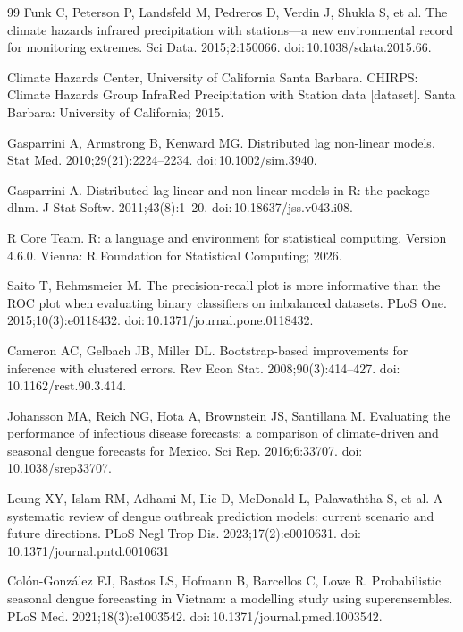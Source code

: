 \documentclass[11pt,a4paper]{article}
\begin{document}
\begin{thebibliography}{99}
 Funk C, Peterson P, Landsfeld M, Pedreros D, Verdin J, Shukla S, et al. The climate hazards infrared precipitation with stations---a new environmental record for monitoring extremes. Sci Data. 2015;2:150066. doi:\,10.1038/sdata.2015.66.

 Climate Hazards Center, University of California Santa Barbara. CHIRPS: Climate Hazards Group InfraRed Precipitation with Station data [dataset]. Santa Barbara: University of California; 2015.

 Gasparrini A, Armstrong B, Kenward MG. Distributed lag non-linear models. Stat Med. 2010;29(21):2224--2234. doi:\,10.1002/sim.3940.

 Gasparrini A. Distributed lag linear and non-linear models in R: the package dlnm. J Stat Softw. 2011;43(8):1--20. doi:\,10.18637/jss.v043.i08.

 R Core Team. R: a language and environment for statistical computing. Version 4.6.0. Vienna: R Foundation for Statistical Computing; 2026.

 Saito T, Rehmsmeier M. The precision-recall plot is more informative than the ROC plot when evaluating binary classifiers on imbalanced datasets. PLoS One. 2015;10(3):e0118432. doi:\,10.1371/journal.pone.0118432.

 Cameron AC, Gelbach JB, Miller DL. Bootstrap-based improvements for inference with clustered errors. Rev Econ Stat. 2008;90(3):414--427. doi:\,10.1162/rest.90.3.414.

 Johansson MA, Reich NG, Hota A, Brownstein JS, Santillana M. Evaluating the performance of infectious disease forecasts: a comparison of climate-driven and seasonal dengue forecasts for Mexico. Sci Rep. 2016;6:33707. doi:\,10.1038/srep33707.

 Leung XY, Islam RM, Adhami M, Ilic D, McDonald L, Palawaththa S, et al. A systematic review of dengue outbreak prediction models: current scenario and future directions. PLoS Negl Trop Dis. 2023;17(2):e0010631. doi:\,10.1371/journal.pntd.0010631

 Col\'{o}n-Gonz\'{a}lez FJ, Bastos LS, Hofmann B, Barcellos C, Lowe R. Probabilistic seasonal dengue forecasting in Vietnam: a modelling study using superensembles. PLoS Med. 2021;18(3):e1003542. doi:\,10.1371/journal.pmed.1003542.


\end{thebibliography}
\end{document}
